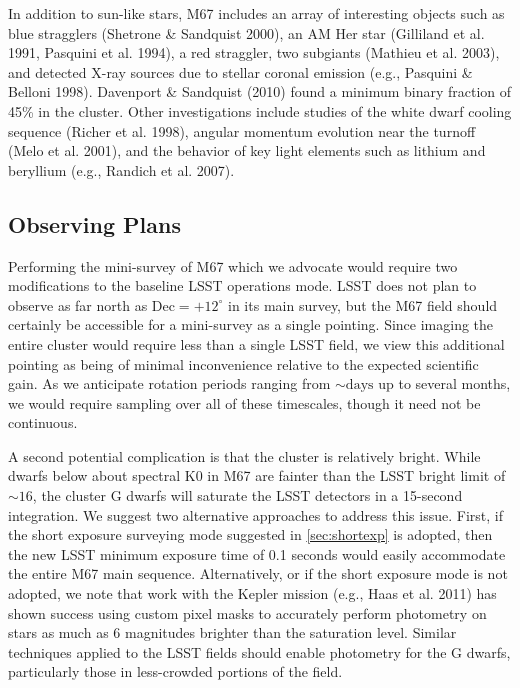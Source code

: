In addition to sun-like stars, M67 includes an array of interesting
objects such as blue stragglers (Shetrone \& Sandquist 2000), an AM
Her star (Gilliland et al. 1991, Pasquini et al. 1994), a red straggler,
two subgiants (Mathieu et al. 2003), and detected X-ray sources due
to stellar coronal emission (e.g., Pasquini \& Belloni 1998). Davenport
\& Sandquist (2010) found a minimum binary fraction of 45\% in the
cluster. Other investigations include studies of the white dwarf cooling
sequence (Richer et al. 1998), angular momentum evolution near the
turnoff (Melo et al. 2001), and the behavior of key light elements
such as lithium and beryllium (e.g., Randich et al. 2007).


\subsection{Observing Plans }

Performing the mini-survey of M67 which we advocate would require
two modifications to the baseline LSST operations mode. LSST does
not plan to observe as far north as $\mathrm{Dec}=+12^{\circ}$ in
its main survey, but the M67 field should certainly be accessible
for a mini-survey as a single pointing. Since imaging the entire cluster
would require less than a single LSST field, we view this additional
pointing as being of minimal inconvenience relative to the expected
scientific gain. As we anticipate rotation periods ranging from $\sim\mathrm{days}$
up to several months, we would require sampling over all of these
timescales, though it need not be continuous.

A second potential complication is that the cluster is relatively
bright. While dwarfs below about spectral K0 in M67 are fainter than
the LSST bright limit of $\sim16$, the cluster G dwarfs will saturate
the LSST detectors in a 15-second integration. We suggest two alternative
approaches to address this issue. First, if the short exposure surveying mode
suggested in \autoref{sec:shortexp} is adopted,
then the new LSST minimum exposure time of 0.1 seconds would easily
accommodate the entire M67 main sequence. Alternatively, or if the
short exposure mode is not adopted, we note that work with the Kepler
mission (e.g., Haas et al. 2011) has shown success using custom pixel
masks to accurately perform photometry on stars as much as 6 magnitudes
brighter than the saturation level. Similar techniques applied to
the LSST fields should enable photometry for the G dwarfs, particularly
those in less-crowded portions of the field.

